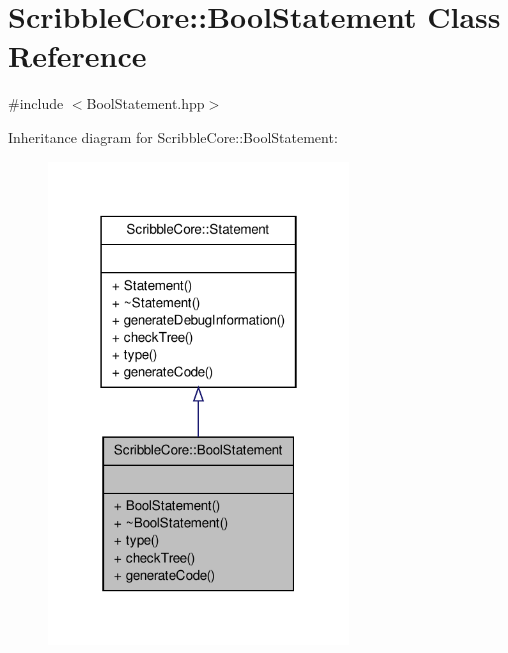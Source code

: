 \hypertarget{class_scribble_core_1_1_bool_statement}{\section{Scribble\-Core\-:\-:Bool\-Statement Class Reference}
\label{class_scribble_core_1_1_bool_statement}
}


{\ttfamily \#include $<$Bool\-Statement.\-hpp$>$}



Inheritance diagram for Scribble\-Core\-:\-:Bool\-Statement\-:
\nopagebreak
\begin{figure}[H]
\begin{center}
\leavevmode
\includegraphics[width=226pt]{class_scribble_core_1_1_bool_statement__inherit__graph}
\end{center}
\end{figure}


